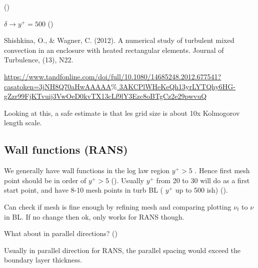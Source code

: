 \documentclass[12pt]{article}
\renewcommand{\_}{\kern-1.5pt\textunderscore\kern-1.5pt}
\begin{document}
\begin{itemize}
(\cite{Spalart2006})\par

 \(  \delta  \rightarrow y^{+}=500 \)  (\cite{Tu2018})\par


\vspace{\baselineskip}
Shishkina, O., $\&$  Wagner, C. (2012). A numerical study of turbulent mixed convection in an enclosure with heated rectangular elements. Journal of Turbulence, (13), N22.\par


\vspace{\baselineskip}
\href{https://www.tandfonline.com/doi/full/10.1080/14685248.2012.677541?casa_token=3jNH8Q70aHwAAAAA%3AKCPlWHeKeQh13yrLYTQhy6HG-gZzr99FjKTvuij3VwOeD0kvTX13cLf9lY3Ezc8oBTgCz2e29pwvuQ}{https://www.tandfonline.com/doi/full/10.1080/14685248.2012.677541?casa\_token=3jNH8Q70aHwAAAAA$\%$ 3AKCPlWHeKeQh13yrLYTQhy6HG-gZzr99FjKTvuij3VwOeD0kvTX13cLf9lY3Ezc8oBTgCz2e29pwvuQ}\par


\vspace{\baselineskip}
Looking at this, a safe estimate is that les grid size is about 10x Kolmogorov length scale. \par


\vspace{\baselineskip}
\subsection{Wall functions (RANS)}\par

We generally have wall functions in the log law region  \( y^{+}>5 \) . Hence first mesh point should be in order of  \( y^{+}>5 \)  (\cite{Tu2018}). Usually  \( y^{+} \)  from 20 to 30 will do as a first start point, and have 8-10 mesh points in turb BL ( \( y^{+} \)  up to 500 ish) (\cite{Tu2018}). \par

Can check if mesh is fine enough by refining mesh and comparing plotting  \(  \nu _{t} \)  to  \(  \nu  \)  in BL. If no change then ok, only works for RANS though.\par

What about in parallel directions? (\cite{Spalart2006})\par

Usually in parallel direction for RANS, the parallel spacing would exceed the boundary layer thickness. \par


\end{itemize}
\end{document}
